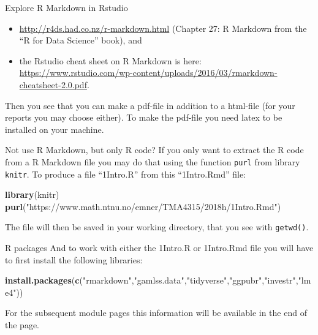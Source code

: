 \documentclass[
  ignorenonframetext,
]{beamer}
\newenvironment{Shaded}{\begin{snugshade}}{\end{snugshade}}
\newcommand{\FunctionTok}[1]{\textcolor[rgb]{0.13,0.29,0.53}{\textbf{#1}}}
\newcommand{\NormalTok}[1]{#1}
\newcommand{\StringTok}[1]{\textcolor[rgb]{0.31,0.60,0.02}{#1}}
\begin{document}
\begin{frame}[fragile]
\begin{block}{Explore R Markdown in Rstudio}
\begin{itemize}
\item
  \url{http://r4ds.had.co.nz/r-markdown.html} (Chapter 27: R Markdown
  from the ``R for Data Science'' book), and
\item
  the Rstudio cheat sheet on R Markdown is here:
  \url{https://www.rstudio.com/wp-content/uploads/2016/03/rmarkdown-cheatsheet-2.0.pdf}.
\end{itemize}

Then you see that you can make a pdf-file in addition to a html-file
(for your reports you may choose either). To make the pdf-file you need
latex to be installed on your machine.
\end{block}

\begin{block}{Not use R Markdown, but only R code?}
\protect\hypertarget{not-use-r-markdown-but-only-r-code}{}
If you only want to extract the R code from a R Markdown file you may do
that using the function \texttt{purl} from library \texttt{knitr}. To
produce a file ``1Intro.R'' from this ``1Intro.Rmd'' file:

\begin{Shaded}
\begin{Highlighting}[]
\FunctionTok{library}\NormalTok{(knitr)}
\FunctionTok{purl}\NormalTok{(}\StringTok{"https://www.math.ntnu.no/emner/TMA4315/2018h/1Intro.Rmd"}\NormalTok{)}
\end{Highlighting}
\end{Shaded}

The file will then be saved in your working directory, that you see with
\texttt{getwd()}.
\end{block}
\end{frame}

\begin{frame}[fragile]
\begin{block}{R packages}
\protect\hypertarget{r-packages}{}
And to work with either the 1Intro.R or 1Intro.Rmd file you will have to
first install the following libraries:

\begin{Shaded}
\begin{Highlighting}[]
\FunctionTok{install.packages}\NormalTok{(}\FunctionTok{c}\NormalTok{(}\StringTok{"rmarkdown"}\NormalTok{,}\StringTok{"gamlss.data"}\NormalTok{,}\StringTok{"tidyverse"}\NormalTok{,}\StringTok{"ggpubr"}\NormalTok{,}\StringTok{"investr"}\NormalTok{,}\StringTok{"lme4"}\NormalTok{))}
\end{Highlighting}
\end{Shaded}

For the subsequent module pages this information will be available in
the end of the page.
\end{block}
\end{frame}
\end{document}
